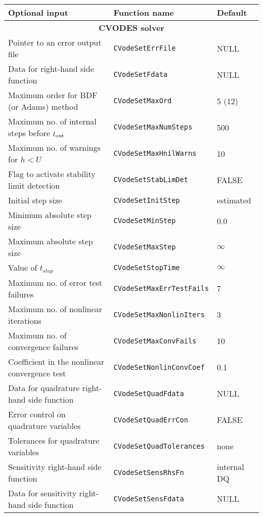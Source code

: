 %
%
\begin{acmtable}{\textwidth}
\centering
\begin{tabularx}{\textwidth}{lll}
{\bf Optional input} & {\bf Function name} & {\bf Default} \\
\hline
\multicolumn{3}{c}{\bf CVODES solver} \\
\hline
Pointer to an error output file & {\tt CVodeSetErrFile} & NULL  \\
Data for right-hand side function & {\tt CVodeSetFdata} & NULL \\
Maximum order for BDF (or Adams) method & {\tt CVodeSetMaxOrd} & 5 (12) \\
Maximum no. of internal steps before $t_{\mbox{\scriptsize out}}$ & {\tt CVodeSetMaxNumSteps} & 500 \\
Maximum no. of warnings for $h < U$ & {\tt CVodeSetMaxHnilWarns} & 10 \\
Flag to activate stability limit detection & {\tt CVodeSetStabLimDet} & FALSE \\
Initial step size & {\tt CVodeSetInitStep} & estimated \\
Minimum absolute step size & {\tt CVodeSetMinStep} & 0.0 \\
Maximum absolute step size & {\tt CVodeSetMaxStep} & $\infty$ \\
Value of $t_{stop}$ & {\tt CVodeSetStopTime} & $\infty$ \\
Maximum no. of error test failures & {\tt CVodeSetMaxErrTestFails} & 7 \\
Maximum no. of nonlinear iterations & {\tt CVodeSetMaxNonlinIters} & 3 \\
Maximum no. of convergence failures & {\tt CVodeSetMaxConvFails} & 10 \\
Coefficient in the nonlinear convergence test & {\tt CVodeSetNonlinConvCoef} & 0.1 \\
Data for quadrature right-hand side function & {\tt CVodeSetQuadFdata} & NULL\\
Error control on quadrature variables & {\tt CVodeSetQuadErrCon} & FALSE \\
Tolerances for quadrature variables & {\tt CVodeSetQuadTolerances} & none \\
Sensitivity right-hand side function & {\tt CVodeSetSensRhsFn}  & internal DQ  \\
Data for sensitivity right-hand side function & {\tt CVodeSetSensFdata} & NULL \\

\end{tabularx}
\end{acmtable}
